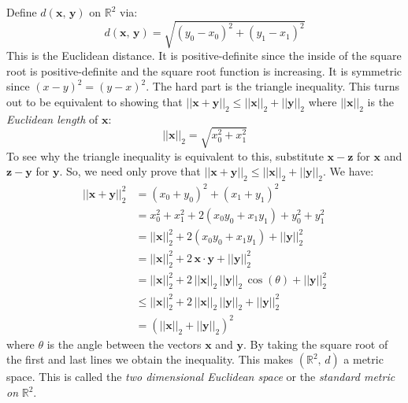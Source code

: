 \documentclass{article}
\theoremstyle{plain}
\theoremstyle{normal}
\newenvironment{example}{%
    \pushQED{\qed}\renewcommand{\qedsymbol}{$\blacksquare$}\examplex%
}{%
    \popQED\endexamplex%
}
\begin{document}
        \begin{example}
            Define $d(\mathbf{x},\,\mathbf{y})$ on $\mathbb{R}^{2}$ via:
            \begin{equation}
                d(\mathbf{x},\,\mathbf{y})=
                \sqrt{(y_{0}-x_{0})^{2}+(y_{1}-x_{1})^{2}}
            \end{equation}
            This is the Euclidean distance. It is positive-definite since
            the inside of the square root is positive-definite and the square
            root function is increasing. It is symmetric since
            $(x-y)^{2}=(y-x)^{2}$. The hard part is the triangle inequality.
            This turns out to be equivalent to showing that
            $||\mathbf{x}+\mathbf{y}||_{2}\leq||\mathbf{x}||_{2}+||\mathbf{y}||_{2}$
            where $||\mathbf{x}||_{2}$ is the \textit{Euclidean length} of
            $\mathbf{x}$:
            \begin{equation}
                ||\mathbf{x}||_{2}=\sqrt{x_{0}^{2}+x_{1}^{2}}
            \end{equation}
            To see why the triangle inequality is equivalent to this,
            substitute $\mathbf{x}-\mathbf{z}$ for $\mathbf{x}$ and
            $\mathbf{z}-\mathbf{y}$ for $\mathbf{y}$. So, we need only prove
            that $||\mathbf{x}+\mathbf{y}||_{2}\leq||\mathbf{x}||_{2}+||\mathbf{y}||_{2}$.
            We have:
            \begin{align}
                ||\mathbf{x}+\mathbf{y}||_{2}^{2}
                &=(x_{0}+y_{0})^{2}+(x_{1}+y_{1})^{2}\\
                &=x_{0}^{2}+x_{1}^{2}+2(x_{0}y_{0}+x_{1}y_{1})+y_{0}^{2}+y_{1}^{2}\\
                &=||\mathbf{x}||_{2}^{2}+2(x_{0}y_{0}+x_{1}y_{1})+||\mathbf{y}||_{2}^{2}\\
                &=||\mathbf{x}||_{2}^{2}+2\,\mathbf{x}\cdot\mathbf{y}+||\mathbf{y}||_{2}^{2}\\
                &=||\mathbf{x}||_{2}^{2}+2\,||\mathbf{x}||_{2}\,||\mathbf{y}||_{2}\,\cos(\theta)+||\mathbf{y}||_{2}^{2}\\
                &\leq||\mathbf{x}||_{2}^{2}+2\,||\mathbf{x}||_{2}\,||\mathbf{y}||_{2}+||\mathbf{y}||_{2}^{2}\\
                &=(||\mathbf{x}||_{2}+||\mathbf{y}||_{2})^{2}
            \end{align}
            where $\theta$ is the angle between the vectors $\mathbf{x}$ and
            $\mathbf{y}$. By taking the square root of the first and last lines
            we obtain
            the inequality. This makes $(\mathbb{R}^{2},\,d)$ a metric space.
            This is called the \textit{two dimensional Euclidean space} or the
            \textit{standard metric on} $\mathbb{R}^{2}$.
        \end{example}
\end{document}

